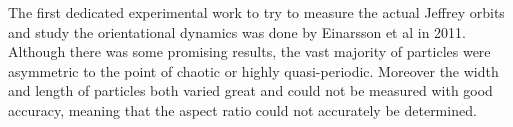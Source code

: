 The first dedicated experimental work to try to measure the actual Jeffrey orbits and study the orientational dynamics was done by Einarsson et al \cite{JonasExperiment} in 2011. Although there was some promising results, the vast majority of particles were asymmetric to the point of chaotic or highly quasi-periodic. Moreover the width and length of particles both varied great and could not be measured with good accuracy, meaning that the aspect ratio could not accurately be determined. 